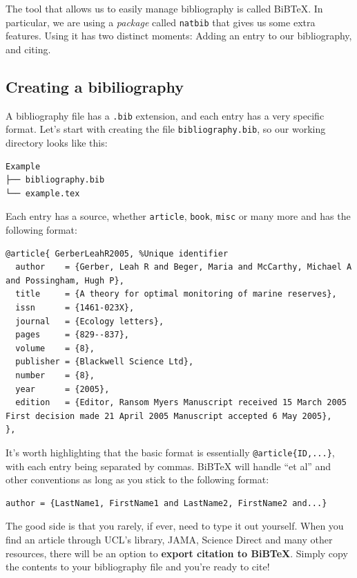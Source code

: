 The tool that allows us to easily manage bibliography is called BiBTeX. In particular, we are using a \emph{package} called \verb|natbib| that gives us some extra features.
Using it has two distinct moments: Adding an entry to our bibliography, and citing.

\subsection{Creating a bibiliography}
A bibliography file has a \verb|.bib| extension, and each entry has a very specific format.
Let's start with creating the file \verb|bibliography.bib|, so our working directory looks like this:
\begin{verbatim}
Example
├── bibliography.bib
└── example.tex
\end{verbatim}

Each entry has a source, whether \verb|article|, \verb|book|, \verb|misc| or many more and has the following format:
\begin{lstlisting}
@article{ GerberLeahR2005, %Unique identifier
  author    = {Gerber, Leah R and Beger, Maria and McCarthy, Michael A and Possingham, Hugh P},
  title     = {A theory for optimal monitoring of marine reserves},
  issn      = {1461-023X},
  journal   = {Ecology letters},
  pages     = {829--837},
  volume    = {8},
  publisher = {Blackwell Science Ltd},
  number    = {8},
  year      = {2005},
  edition   = {Editor, Ransom Myers Manuscript received 15 March 2005 First decision made 21 April 2005 Manuscript accepted 6 May 2005},
},
\end{lstlisting}

It's worth highlighting that the basic format is essentially \verb|@article{ID,...}|, with each entry being separated by commas.
BiBTeX will handle ``et al'' and other conventions as long as you stick to the following format:
\begin{lstlisting}
author = {LastName1, FirstName1 and LastName2, FirstName2 and...}
\end{lstlisting}

The good side is that you rarely, if ever, need to type it out yourself.
When you find an article through UCL's library, JAMA, Science Direct and many other resources, there will be an option to \textbf{export citation to BiBTeX}.
Simply copy the contents to your bibliography file and you're ready to cite!

